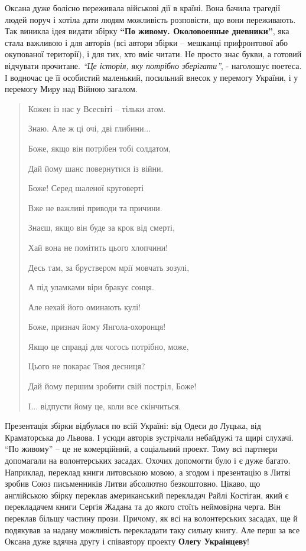 Оксана дуже болісно переживала військові дії в країні. Вона бачила трагедії
людей поруч і хотіла дати людям можливість розповісти, що вони переживають. Так
виникла ідея видати збірку \textbf{\enquote{По живому. Околовоенные дневники}}, яка стала
важливою і для авторів (всі автори збірки – мешканці прифронтової або
окупованої території), і для тих, хто вміє читати. Не просто знає букви, а
готовий відчувати прочитане. \emph{\enquote{Це історія, яку потрібно зберігати}}, - наголошує
поетеса. І водночас це її особистий маленький, посильний внесок у перемогу
України, і у перемогу Миру над Війною загалом.

\medskip
\begin{quote}
\color{blue} Кожен із нас у Всесвіті – тільки атом.

Знаю. Але ж ці очі, дві глибини...

Боже, якщо він потрібен тобі солдатом,

Дай йому шанс повернутися із війни.

Боже! Серед шаленої круговерті

Вже не важливі приводи та причини.

Знаєш, якщо він буде за крок від смерті,

Хай вона не помітить цього хлопчини!

Десь там, за бруствером мрії мовчать зозулі,

А під уламками віри бракує сонця.

Але нехай його оминають кулі!

Боже, признач йому Янгола-охоронця!

Якщо це справді для чогось потрібно, може,

Цього не покарає Твоя десниця?

Дай йому першим зробити свій постріл, Боже!

І... відпусти йому це, коли все скінчиться.	
\end{quote}
\medskip

Презентація збірки відбулася по всій Україні: від Одеси до Луцька, від
Краматорська до Львова. І усюди авторів зустрічали небайдужі та щирі слухачі.
\enquote{По живому} – це не комерційний, а соціальний проект. Тому всі партнери
допомагали на волонтерських засадах. Охочих допомогти було і є дуже багато.
Наприклад, переклад книги литовською мовою, а згодом і презентацію в Литві
зробив Союз письменників Литви абсолютно безкоштовно. Цікаво, що англійською
збірку переклав американський перекладач Райлі Костіган, який є перекладачем
книги Сергія Жадана та до якого стоїть неймовірна черга. Він переклав більшу
частину прози. Причому, як всі на волонтерських засадах, ще й подякував за
надану можливість перекладати таку сильну книгу. Але перш за все Оксана дуже
вдячна другу і співавтору проекту \textbf{Олегу Украінцеву}!

